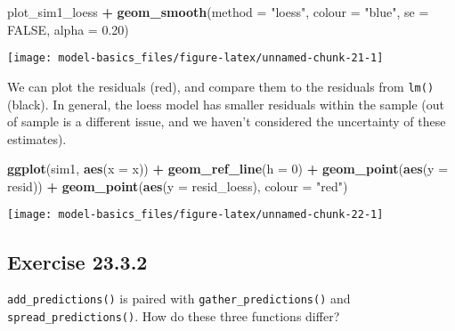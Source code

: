\documentclass[]{book}
\newenvironment{Shaded}{\begin{snugshade}}{\end{snugshade}}
\newcommand{\DataTypeTok}[1]{\textcolor[rgb]{0.13,0.29,0.53}{#1}}
\newcommand{\DecValTok}[1]{\textcolor[rgb]{0.00,0.00,0.81}{#1}}
\newcommand{\FloatTok}[1]{\textcolor[rgb]{0.00,0.00,0.81}{#1}}
\newcommand{\KeywordTok}[1]{\textcolor[rgb]{0.13,0.29,0.53}{\textbf{#1}}}
\newcommand{\NormalTok}[1]{#1}
\newcommand{\OperatorTok}[1]{\textcolor[rgb]{0.81,0.36,0.00}{\textbf{#1}}}
\newcommand{\OtherTok}[1]{\textcolor[rgb]{0.56,0.35,0.01}{#1}}
\newcommand{\StringTok}[1]{\textcolor[rgb]{0.31,0.60,0.02}{#1}}
\theoremstyle{plain}
\theoremstyle{remark}
\begin{document}
\begin{Shaded}
\begin{Highlighting}[]
\NormalTok{plot_sim1_loess }\OperatorTok{+}
\StringTok{  }\KeywordTok{geom_smooth}\NormalTok{(}\DataTypeTok{method =} \StringTok{"loess"}\NormalTok{, }\DataTypeTok{colour =} \StringTok{"blue"}\NormalTok{, }\DataTypeTok{se =} \OtherTok{FALSE}\NormalTok{, }\DataTypeTok{alpha =} \FloatTok{0.20}\NormalTok{)}
\end{Highlighting}
\end{Shaded}

\begin{center}\texttt{[image: model-basics\_files/figure-latex/unnamed-chunk-21-1]} \end{center}

We can plot the residuals (red), and compare them to the residuals from
\texttt{lm()} (black). In general, the loess model has smaller residuals
within the sample (out of sample is a different issue, and we haven't
considered the uncertainty of these estimates).

\begin{Shaded}
\begin{Highlighting}[]
\KeywordTok{ggplot}\NormalTok{(sim1, }\KeywordTok{aes}\NormalTok{(}\DataTypeTok{x =}\NormalTok{ x)) }\OperatorTok{+}
\StringTok{  }\KeywordTok{geom_ref_line}\NormalTok{(}\DataTypeTok{h =} \DecValTok{0}\NormalTok{) }\OperatorTok{+}
\StringTok{  }\KeywordTok{geom_point}\NormalTok{(}\KeywordTok{aes}\NormalTok{(}\DataTypeTok{y =}\NormalTok{ resid)) }\OperatorTok{+}
\StringTok{  }\KeywordTok{geom_point}\NormalTok{(}\KeywordTok{aes}\NormalTok{(}\DataTypeTok{y =}\NormalTok{ resid_loess), }\DataTypeTok{colour =} \StringTok{"red"}\NormalTok{)}
\end{Highlighting}
\end{Shaded}

\begin{center}\texttt{[image: model-basics\_files/figure-latex/unnamed-chunk-22-1]} \end{center}

\hypertarget{exercise-23.3.2}{%
\subsection*{\texorpdfstring{Exercise
{23.3.2}}{Exercise 23.3.2}}\label{exercise-23.3.2}}

\texttt{add\_predictions()} is paired with
\texttt{gather\_predictions()} and \texttt{spread\_predictions()}. How
do these three functions differ?
\end{document}
